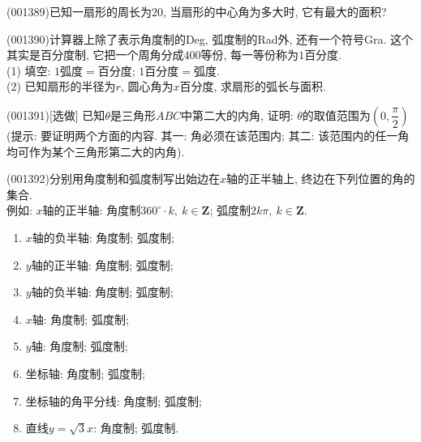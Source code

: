 \item (001389)已知一扇形的周长为$20$, 当扇形的中心角为多大时, 它有最大的面积?
\item (001390)计算器上除了表示角度制的{\rm Deg}, 弧度制的{\rm Rad}外, 还有一个符号{\rm Gra}. 这个其实是百分度制, 它把一个周角分成$400$等份, 每一等份称为$1$百分度.\\ 
(1) 填空: $1$弧度$=$百分度; $1$百分度$=$弧度.\\ 
(2) 已知扇形的半径为$r$, 圆心角为$x$百分度, 求扇形的弧长与面积.
\item (001391)[选做]
已知$\theta$是三角形$ABC$中第二大的内角, 证明: $\theta$的取值范围为$\left(0,\dfrac{\pi}{2}\right)$(提示: 要证明两个方面的内容. 其一: 角必须在该范围内; 其二: 该范围内的任一角均可作为某个三角形第二大的内角).
\item (001392)分别用角度制和弧度制写出始边在$x$轴的正半轴上, 终边在下列位置的角的集合.\\ 
例如: $x$轴的正半轴: 角度制\underline{$360^\circ \cdot k, \ k\in \mathbf{Z}$}; 弧度制\underline{$2k\pi, \ k\in \mathbf{Z}$}.
\begin{enumerate}[(1)]
\item $x$轴的负半轴: 角度制; 弧度制;\\ 
\item $y$轴的正半轴: 角度制; 弧度制;\\ 
\item $y$轴的负半轴: 角度制; 弧度制;\\ 
\item $x$轴: 角度制; 弧度制;\\ 
\item $y$轴: 角度制; 弧度制;\\ 
\item 坐标轴: 角度制; 弧度制;\\ 
\item 坐标轴的角平分线: 角度制; 弧度制;\\ 
\item 直线$y=\sqrt{3}x$: 角度制; 弧度制.\\ 
\end{enumerate}
